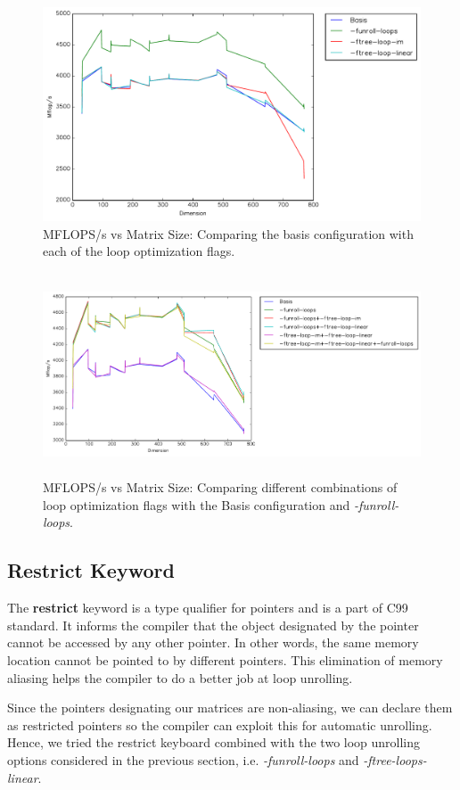 \documentclass{article}
\begin{document}
  \begin{figure}[h]
    \centering
    \includegraphics[width=.7\textwidth]{timing-loops-vs-basis.pdf}
    \caption{MFLOPS/s vs Matrix Size: Comparing the basis configuration with each of the loop optimization flags.}
    \label{fig:timing-loops1}
  \end{figure}
  
    \begin{figure}[h]
    \centering
    \includegraphics[width=14cm,height=6cm]{timing-loopunroll-vs-combos.pdf}
    \caption{MFLOPS/s vs Matrix Size: Comparing different combinations of loop optimization flags with the Basis configuration and \textit{-funroll-loops}.}
    \label{fig:timing-loops2}
  \end{figure}


\subsection{Restrict Keyword}

The {\bf restrict} keyword is a type qualifier for pointers and is a part of C99 standard. It informs the compiler that the object designated by the pointer cannot be accessed by any other pointer. In other words, the same memory location cannot be pointed to by different pointers. This elimination of memory aliasing helps the compiler to do a better job at loop unrolling.

Since the pointers designating our matrices are non-aliasing, we can declare them as restricted pointers so the compiler can exploit this for automatic unrolling. 
Hence, we tried the restrict keyboard combined with the two loop unrolling options considered in the previous section, i.e. \textit{-funroll-loops} and \textit{-ftree-loops-linear}. 
\end{document}

